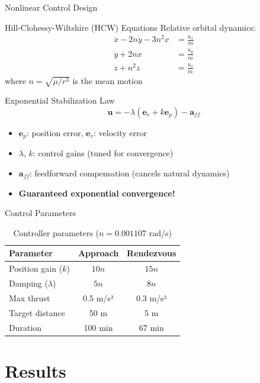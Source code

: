 \documentclass[aspectratio=169]{beamer}
\begin{document}
\begin{frame}{Nonlinear Control Design}
\begin{block}{Hill-Clohessy-Wiltshire (HCW) Equations}
Relative orbital dynamics:
\begin{align*}
\ddot{x} - 2n\dot{y} - 3n^2x &= \frac{u_x}{m} \\
\ddot{y} + 2n\dot{x} &= \frac{u_y}{m} \\
\ddot{z} + n^2z &= \frac{u_z}{m}
\end{align*}
where $n = \sqrt{\mu/r^3}$ is the mean motion
\end{block}

\begin{block}{Exponential Stabilization Law}
\[
\mathbf{u} = -\lambda(\mathbf{e}_v + k\mathbf{e}_p) - \mathbf{a}_{ff}
\]
\begin{itemize}
    \item $\mathbf{e}_p$: position error, $\mathbf{e}_v$: velocity error
    \item $\lambda$, $k$: control gains (tuned for convergence)
    \item $\mathbf{a}_{ff}$: feedforward compensation (cancels natural dynamics)
    \item \textbf{Guaranteed exponential convergence!}
\end{itemize}
\end{block}
\end{frame}

\begin{frame}{Control Parameters}
\begin{table}
\centering
\begin{tabular}{lcc}
\toprule
\textbf{Parameter} & \textbf{Approach} & \textbf{Rendezvous} \\
\midrule
Position gain ($k$) & $10n$ & $15n$ \\
Damping ($\lambda$) & $5n$ & $8n$ \\
Max thrust & 0.5 m/s² & 0.3 m/s² \\
Target distance & 50 m & 5 m \\
Duration & 100 min & 67 min \\
\bottomrule
\end{tabular}
\caption{Controller parameters ($n = 0.001107$ rad/s)}
\end{table}
\end{frame}

\section{Results}
\end{document}

